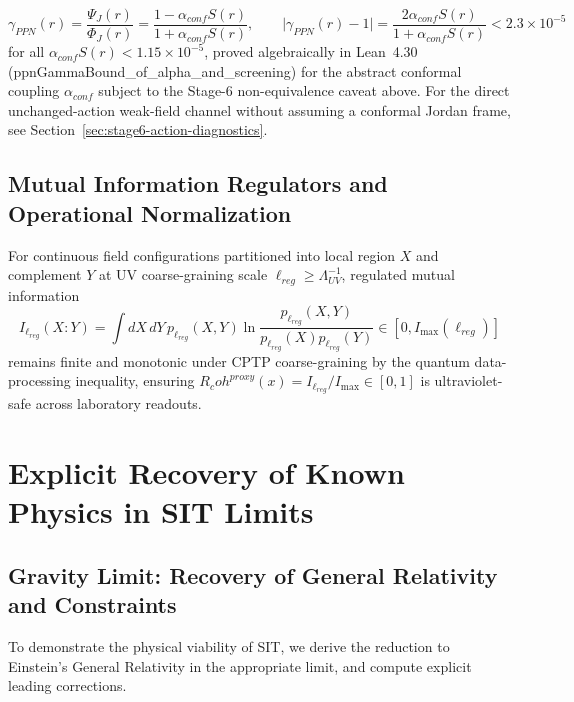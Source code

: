 \documentclass[american,11pt,letterpaper]{article}
\newcommand{\Rcoh}{R_{\mathrm{coh}}}
\def\mathcal#1{#1}%
\def\mathrm#1{#1}%
\def\texttt#1{#1}%
\def\Rcoh{R_coh}%
\begin{document}
\begin{equation}
\gamma_{\mathrm{PPN}}(r) = \frac{\Psi_J(r)}{\Phi_J(r)} = \frac{1 - \alpha_{\mathrm{conf}}S(r)}{1 + \alpha_{\mathrm{conf}}S(r)},
\qquad
\bigl|\gamma_{\mathrm{PPN}}(r) - 1\bigr| = \frac{2\alpha_{\mathrm{conf}}S(r)}{1 + \alpha_{\mathrm{conf}}S(r)} < 2.3 \times 10^{-5}
\end{equation}
for all $\alpha_{\mathrm{conf}} S(r) < 1.15 \times 10^{-5}$, proved algebraically in Lean~4.30 (\texttt{ppn\allowbreak{}Gamma\allowbreak{}Bound\_\allowbreak{}of\_\allowbreak{}alpha\_\allowbreak{}and\_\allowbreak{}screening}) for the abstract conformal coupling $\alpha_{\mathrm{conf}}$ subject to the Stage-6 non-equivalence caveat above. For the direct unchanged-action weak-field channel without assuming a conformal Jordan frame, see Section~\ref{sec:stage6-action-diagnostics}.

\subsection{Mutual Information Regulators and Operational Normalization}

For continuous field configurations partitioned into local region $X$ and complement $Y$ at UV coarse-graining scale $\ell_{\mathrm{reg}} \ge \Lambda_{\mathrm{UV}}^{-1}$, regulated mutual information
\[
\mathcal{I}_{\ell_{\mathrm{reg}}}(X : Y) = \int dX\,dY\,p_{\ell_{\mathrm{reg}}}(X,Y)\ln\frac{p_{\ell_{\mathrm{reg}}}(X,Y)}{p_{\ell_{\mathrm{reg}}}(X)p_{\ell_{\mathrm{reg}}}(Y)} \in [0, \mathcal{I}_{\max}(\ell_{\mathrm{reg}})]
\]
remains finite and monotonic under CPTP coarse-graining by the quantum data-processing inequality, ensuring $\Rcoh^{\mathrm{proxy}}(x) = \mathcal{I}_{\ell_{\mathrm{reg}}}/\mathcal{I}_{\max} \in [0,1]$ is ultraviolet-safe across laboratory readouts.

\section{Explicit Recovery of Known Physics in SIT Limits}

\subsection{Gravity Limit: Recovery of General Relativity and Constraints}
\label{app:GRlimit}

To demonstrate the physical viability of SIT, we derive the reduction to Einstein's General Relativity in the appropriate limit, and compute explicit leading corrections.
\end{document}

